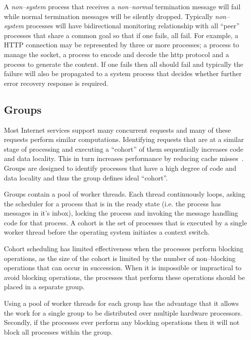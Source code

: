 \documentclass[conference]{IEEEtran}
\begin{document}
A \emph{non--system} process that receives a \emph{non--normal} termination message will fail while normal termination messages will be silently dropped. Typically \emph{non--system} processes will have bidirectional monitoring relationship with all ``peer'' processes that share a common goal so that if one fails, all fail. For example, a HTTP connection may be represented by three or more processes; a process to manage the socket, a process to encode and decode the http protocol and a process to generate the content. If one fails then all should fail and typically the failure will also be propagated to a system process that decides whether further error recovery response is required.

\subsection{Groups}
\label{section:Groups}

Most Internet services support many concurrent requests and many of these requests perform similar computations. Identifying requests that are at a similar stage of processing and executing a ``cohort'' of them sequentially increases code and data locality. This in turn increases performance by reducing cache misses~\cite{Larus:2002:Cohort,welsh03Adaptive}. Groups are designed to identify processes that have a high degree of code and data locality and thus the group defines ideal ``cohort''.

Groups contain a pool of worker threads. Each thread continuously loops, asking the scheduler for a process that is in the ready state (i.e. the process has messages in it's inbox), locking the process and invoking the message handling code for that process. A cohort is the set of processes that is executed by a single worker thread before the operating system initiates a context switch.

Cohort scheduling has limited effectiveness when the processes perform blocking operations, as the size of the cohort is limited by the number of non--blocking operations that can occur in succession. When it is impossible or impractical to avoid blocking operations, the processes that perform these operations should be placed in a separate group.

Using a pool of worker threads for each group has the advantage that it allows the work for a single group to be distributed over multiple hardware processors. Secondly, if the processes ever perform any blocking operations then it will not block all processes within the group. 
\end{document}
